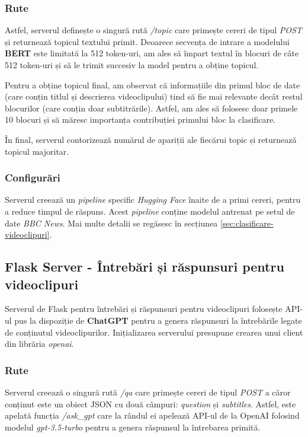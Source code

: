 \subsubsection{Rute}
\par
Astfel, serverul definește o singură rută \textit{/topic} care primește cereri de tipul \textit{POST}
și returnează topicul textului primit. Deoarece secvența de intrare a modelului \textbf{BERT} este 
limitată la 512 token-uri, am ales să împart textul în blocuri de câte 512 token-uri și să le trimit
succesiv la model pentru a obține topicul.
\par
Pentru a obține topicul final, am observat că informațiile din primul bloc de date (care conțin titlul 
și descrierea videoclipului) tind să fie mai relevante decât restul blocurilor (care conțin doar subtitrările).
Astfel, am ales să folosesc doar primele 10 blocuri și să măresc importanța contribuției primului bloc
la clasificare.
\par
În final, serverul contorizează numărul de apariții ale fiecărui topic și returnează topicul majoritar.
\subsubsection{Configurări}
\par
Serverul creează un \textit{pipeline} specific \textit{Hugging Face} înaite de a primi cereri, pentru a reduce
timpul de răspuns. Acest \textit{pipeline} conține modelul antrenat pe setul de date
\textit{BBC News}. Mai multe detalii se regăsesc în secțiunea \ref{sec:clasificare-videoclipuri}.

\subsection{Flask Server - Întrebări și răspunsuri pentru videoclipuri}
Serverul de Flask pentru întrebări și răspunsuri pentru videoclipuri folosește API-ul pus
la dispoziție de \textbf{ChatGPT} pentru a genera răspunsuri la întrebările legate de conținutul
videoclipurilor. Inițializarea serverului presupune crearea unui client din librăria 
\textit{openai}.
\subsubsection{Rute}
\par
Serverul creează o singură rută \textit{/qa} care primește cereri de tipul \textit{POST}
a căror conținut este un obiect JSON cu două câmpuri: \textit{question} și \textit{subtitles}.
Astfel, este apelată funcția \textit{/ask\_gpt} care la rândul ei apelează API-ul de la OpenAI
folosind modelul \textit{gpt-3.5-turbo} pentru a genera răspunsul la întrebarea primită.



